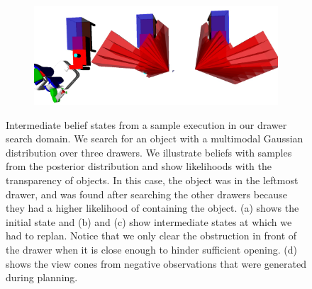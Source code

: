 \begin{figure}
\begin{subfigure}[b]{0.48\linewidth}
    \caption{}
  \end{subfigure}
  \begin{subfigure}[b]{0.48\linewidth}
    \includegraphics[width=\textwidth]{drawer_images/drawer_dist_negreg.png}
    \caption{}
  \end{subfigure}
  \caption{Intermediate belief states from a sample execution in our
    drawer search domain. We search for an object with a multimodal
    Gaussian distribution over three drawers. We illustrate beliefs with
    samples from the posterior distribution and show likelihoods with
    the transparency of objects. In this case, the object was in the
    leftmost drawer, and was found after searching the other
    drawers because they had a higher likelihood of containing the object. (a) shows the initial state and (b) and (c) show
    intermediate states at which we had to replan. Notice that we only clear
    the obstruction in front of the drawer when it is close enough to hinder sufficient opening.
    (d) shows the view cones from negative observations that were generated during planning.}
  \label{fig:drawerimgs}
\end{figure}

